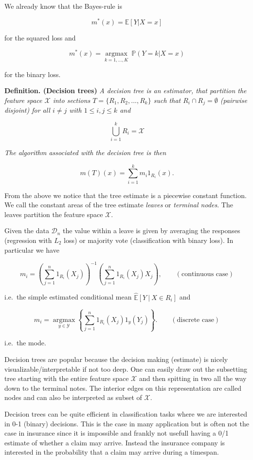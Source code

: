 \documentclass[a4paper,12pt,openany]{book}
\begin{document}
We already know that the Bayes-rule is

\[
m^\ast(x)=\mathbb E[Y|X=x]
\]

for the squared loss and

\[
m^\ast(x)=\underset{k=1,\dots,K}{\operatorname{argmax}}\ \mathbb P(Y=k|X=x)
\]

for the binary loss.

\textbf{Definition. (Decision trees)} \emph{A decision tree is an estimator, that partition the feature space \(\mathcal X\) into sections \(T=\{R_1,R_2,...,R_k\}\) such that \(R_i\cap R_j=\emptyset\) (pairwise disjoint) for all \(i\ne j\) with \(1\le i,j\le k\) and}

\[
\bigcup_{i=1}^kR_i=\mathcal X
\]

\emph{The algorithm associated with the decision tree is then}

\[
m(T)(x)=\sum_{i=1}^k m_i 1_{R_i}(x).
\]

From the above we notice that the tree estimate is a piecewise constant function. We call the constant areas of the tree estimate \emph{leaves} or \emph{terminal nodes}. The leaves partition the feature space \(\mathcal X\).

Given the data \(\mathcal D_n\) the value within a leave is given by averaging the responses (regression with \(L_2\) loss) or majority vote (classification with binary loss). In particular we have

\[
m_i=\left(\sum_{j=1}^n1_{R_i}(X_j)\right)^{-1}\left(\sum_{j=1}^n1_{R_i}(X_j)X_j\right),\qquad (\text{continuous case})
\]

i.e.~the simple estimated conditional mean \(\mathbb {\hat E}[Y\ \vert\ X\in R_i]\) and

\[
m_i=\underset{y\in \mathcal Y}{\operatorname{argmax}}\left\{\sum_{j=1}^n1_{R_i}(X_j)1_{y}(Y_j)\right\}.\qquad (\text{discrete case})
\]

i.e.~the mode.

Decision trees are popular because the decision making (estimate) is nicely visualizable/interpretable if not too deep. One can easily draw out the subsetting tree starting with the entire feature space \(\mathcal X\) and then spitting in two all the way down to the terminal notes. The interior edges on this representation are called nodes and can also be interpreted as subset of \(\mathcal X\).

Decision trees can be quite efficient in classification tasks where we are interested in 0-1 (binary) decisions. This is the case in many application but is often not the case in insurance since it is impossible and frankly not usefull having a 0/1 estimate of whether a claim may arrive. Instead the insurance company is interested in the probability that a claim may arrive during a timespan.
\end{document}
